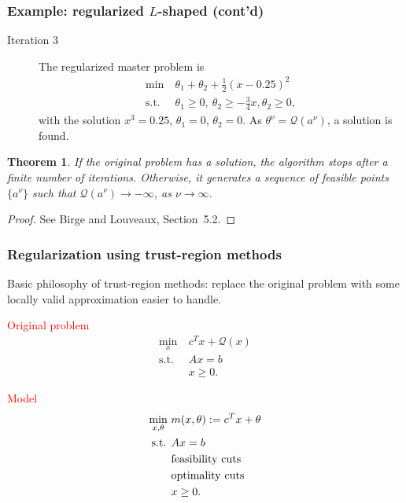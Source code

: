 \documentclass{beamer}
\newtheorem{theo}{Theorem}
\def\cQ{\mathcal{Q}}
\begin{document}
\begin{frame}
\frametitle{Example: regularized $L$-shaped (cont'd)}

\begin{description}
\item[Iteration 3]
The regularized master problem is
\begin{align*}
\min\ & \theta_1 + \theta_2 + \frac{1}{2}(x-0.25)^2 \\
\mbox{s.t. } & \theta_1 \geq 0,\ \theta_2 \geq -\frac{3}{4}x, \theta_2
\geq 0,
\end{align*}
with the solution $x^3 = 0.25$, $\theta_1 = 0$, $\theta_2 = 0$.
As $\theta^{\nu} = \mathcal{Q}(a^{\nu})$, a solution is found.
\end{description}

\begin{theo}
If the original problem has a solution, the algorithm stops after a finite number of iterations.
Otherwise, it generates a sequence of feasible points $\lbrace a^{\nu} \rbrace$ such that
$\mathcal{Q}(a^{\nu}) \rightarrow -\infty$, as $\nu \rightarrow \infty$.
\end{theo}
\begin{proof}
See Birge and Louveaux, Section~5.2.
\end{proof}
\end{frame}

\begin{frame}
\frametitle{Regularization using trust-region methods}

{\blue Basic philosophy} of trust-region methods: replace the original problem with some locally valid approximation easier to handle.

\mbox{}

\begin{center}
\begin{minipage}[t]{0.49\textwidth}
\centering
\textcolor{red}{Original problem}
\begin{align*}
	\min_x \ & c^T x + \cQ(x) \\
	\mbox{s.t. } & Ax = b \\
	& x \geq 0.
\end{align*}
\end{minipage}
\begin{minipage}[t]{0.49\textwidth}
\centering
\textcolor{red}{Model}
\begin{align*}
	\min_{x, \theta} \ & m(x, \theta) := c^T x + \theta \\
	\mbox{s.t. } & Ax = b \\
	& {\rm feasibility\ cuts} \\
	& {\rm optimality\ cuts} \\
	& x \geq 0.
\end{align*}
\end{minipage}
\end{center}

\end{frame}
\end{document}

